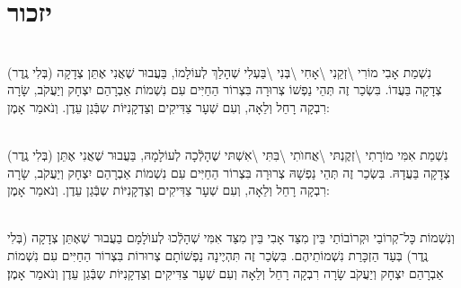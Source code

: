 \documentclass[twoside, openany, parskip=half, 11pt]{book}
\begin{document}
 \vfill
{}\pageref{al hakol}





\sepline

\chapter{ יזכור }
 
 
 
 \\
 נִשְׁמַת אָבִי מוֹרִי \textbackslash  זְקֵנִי \textbackslash אָחִי \textbackslash בְּנִי \textbackslash בַּעְלִי   שְׁהָלַךְ לְעוֹלָמוֹ, בַּעֲבוּר שֶׁאֲנִי אֶתֵּן צְדָקָה (בְּלִי נֶֽדֶר) צְדָקָה בַּעֲדוֹ. בִּשְׂכַר זֶה תְּהֵי נַפְשׁוֹ צְרוּרָה בִּצְרוֹר הַחַיִּים עִם נִשְׁמוֹת אַבְרָהַם יִצְחָק וְיַעֲקֹב, שָׂרָה רִבְקָה רָחֵל וְלֵאָה, וְעִם שְׁעָר צַדִּיקִים וְצַדְקָנִיּוֹת שְבְּֿגַן עֵדֶן. וְנֹאמַר אָמֶן:

 \\
 נִשְׁמַת אִמִּי מוֹרָתִי \textbackslash  זְקֶנְתּי \textbackslash אֲחוׂתִי \textbackslash בִּתִּי \textbackslash אִשְׁתּי 
 שֶׁהָלְֿכָה לְעוֹלָמָהּ, בַּעֲבוּר שֶׁאֲנִי אֶתֵּן (בְּלִי נֶֽדֶר) צְדָקָה בַּעֲדָהּ. בִּשְׂכַר זֶה תְּהֵי נַפְשָׁהּ צְרוּרָה בִּצְרוֹר הַחַיִּים עִם נִשְׁמוֹת אַבְרָהַם יִצְחָק וְיַעֲקֹב, שָׂרָה רִבְקָה רָחֵל וְלֵאָה, וְעִם שְׁעָר צַדִּיקִים וְצַדְקָנִיּוֹת שְבְּֿגַן עֵדֶן. וְנֹאמַר אָמֶן:

 \\
 וְנִשְׁמוֹת כָּל־קְרוֹבַי וּקְרוֹבוֹתַי בֵּין מִצַּד אָבִי בֵּין מִצַּד אִמִּי 
 שְׁהָלְֿכוּ לְעוׂלָמָם
  בַעֲבוּר שֶׁאֶתֵּן צְדָקָה (בְּלִי נֶֽדֶר) בְּעַד הַזְכָּרַת נִשְׁמוֹתֵיהֶם. בִּשְׂכַר זֶה תִּהְיֶינָה נַפְשׁוֹתָם צְרוּרוֹת בִּצְרוֹר הַחַיִּים עִם נִשְׁמוֹת אַבְרָהַם יִצְחָק וְיַעֲקֹב שָׂרָה רִבְקָה רָחֵל וְלֵאָה וְעִם שְׁעָר צַדִּיקִים וְצַדְקָנִיּוֹת שְבְּֿגַן עֵדֶן וְנֹאמַר אָמֶן׃
\end{document}
